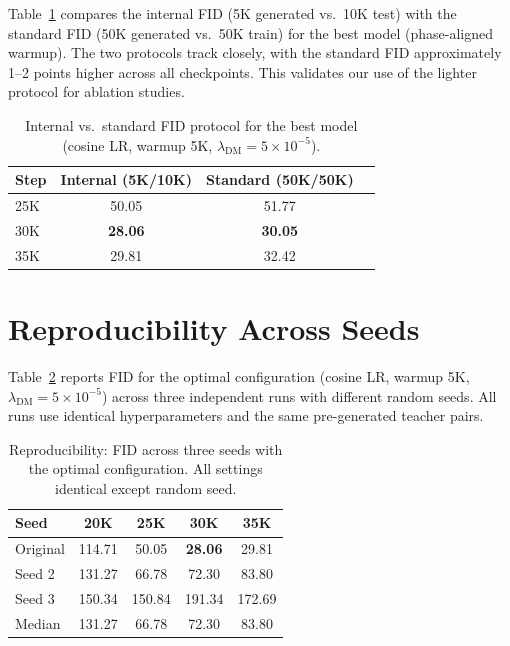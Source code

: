 \documentclass{article}
\theoremstyle{plain}
\theoremstyle{remark}
\begin{document}
Table~\ref{tab:standard_fid} compares the internal FID (5K generated vs.\ 10K test) with the standard FID (50K generated vs.\ 50K train) for the best model (phase-aligned warmup). The two protocols track closely, with the standard FID approximately 1--2 points higher across all checkpoints. This validates our use of the lighter protocol for ablation studies.

\begin{table}[h]
\centering
\caption{Internal vs.\ standard FID protocol for the best model (cosine LR, warmup 5K, $\lambda_{\text{DM}} = 5\times 10^{-5}$).}
\label{tab:standard_fid}
\begin{tabular}{lccc}
\toprule
Step & Internal (5K/10K) & Standard (50K/50K) \\
\midrule
25K & 50.05 & 51.77 \\
30K & \textbf{28.06} & \textbf{30.05} \\
35K & 29.81 & 32.42 \\
\bottomrule
\end{tabular}
\end{table}

\section{Reproducibility Across Seeds}
\label{app:reproducibility}

Table~\ref{tab:reproducibility} reports FID for the optimal configuration (cosine LR, warmup 5K, $\lambda_{\text{DM}} = 5\times 10^{-5}$) across three independent runs with different random seeds. All runs use identical hyperparameters and the same pre-generated teacher pairs.

\begin{table}[h]
\centering
\caption{Reproducibility: FID across three seeds with the optimal configuration. All settings identical except random seed.}
\label{tab:reproducibility}
\begin{tabular}{lcccc}
\toprule
Seed & 20K & 25K & 30K & 35K \\
\midrule
Original & 114.71 & 50.05 & \textbf{28.06} & 29.81 \\
Seed 2 & 131.27 & 66.78 & 72.30 & 83.80 \\
Seed 3 & 150.34 & 150.84 & 191.34 & 172.69 \\
\midrule
Median & 131.27 & 66.78 & 72.30 & 83.80 \\
\bottomrule
\end{tabular}
\end{table}
\end{document}
